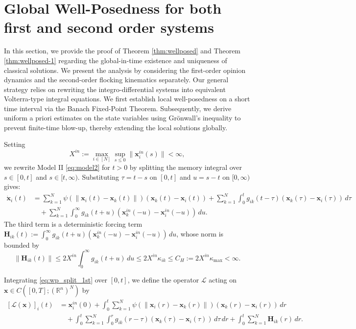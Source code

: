 \documentclass[11pt]{amsart}
\numberwithin{equation}{section}
\begin{document}
\section{Global Well-Posedness for both first and second order systems}\label{sec:proof_wp}
In this section, we provide the proof of Theorem \ref{thm:wellposed} and Theorem \ref{thm:wellposed-1} regarding the global-in-time existence and uniqueness of classical solutions. We present the analysis by considering the first-order opinion dynamics and the second-order flocking kinematics separately. Our general strategy relies on rewriting the integro-differential systems into equivalent Volterra-type integral equations. We first establish local well-posedness on a short time interval via the Banach Fixed-Point Theorem. Subsequently, we derive uniform a priori estimates on the state variables using Gr\"onwall's inequality to prevent finite-time blow-up, thereby extending the local solutions globally.

 Setting
$$
X^{in} := \max_{i\in[N]} \sup_{s \le 0} \|\boldsymbol{x}^{in}_i(s)\| < \infty,
$$
we rewrite Model II \eqref{eq:model2} for $t > 0$ by splitting the memory integral over $s\in[0,t]$ and $s\in[t,\infty)$. Substituting $\tau = t-s$ on $[0,t]$ and $u = s-t$ on $[0,\infty)$ gives:
\begin{equation}\label{eq:wp_split_1st}
\begin{aligned}
\dot{\boldsymbol{x}}_i(t) &= \sum_{k=1}^N \psi(\|\boldsymbol{x}_i(t)-\boldsymbol{x}_k(t)\|) (\boldsymbol{x}_k(t)-\boldsymbol{x}_i(t)) + \sum_{k=1}^N \int_0^t g_{ik}(t-\tau)(\boldsymbol{x}_k(\tau)-\boldsymbol{x}_i(\tau)) \, d\tau \\
&\quad + \sum_{k=1}^N \int_0^\infty g_{ik}(t+u)(\boldsymbol{x}^{in}_k(-u)-\boldsymbol{x}^{in}_i(-u)) \, du.
\end{aligned}
\end{equation}
The third term is a deterministic forcing term $\boldsymbol{H}_{ik}(t) := \int_0^\infty g_{ik}(t+u)(\boldsymbol{x}^{in}_k(-u)-\boldsymbol{x}^{in}_i(-u)) \, du$, whose norm is bounded by
\begin{equation}\label{eq:H_bound_1st}
\|\boldsymbol{H}_{ik}(t)\| \le 2X^{in} \int_0^\infty g_{ik}(t+u)\,du \le 2X^{in} \kappa_{ik} \le C_H := 2X^{in} \kappa_{\max} < \infty.
\end{equation}

Integrating \eqref{eq:wp_split_1st} over $[0,t]$, we define the operator $\mathcal{L}$ acting on $\boldsymbol{x}\in C([0,T];(\mathbb{R}^n)^N)$ by
\begin{equation}\label{eq:operatorL_1st}
\begin{aligned}
[\mathcal{L}(\boldsymbol{x})]_i(t) &= \boldsymbol{x}^{in}_i(0) + \int_0^t \sum_{k=1}^N \psi(\|\boldsymbol{x}_i(r)-\boldsymbol{x}_k(r)\|)(\boldsymbol{x}_k(r)-\boldsymbol{x}_i(r)) \, dr \\
&\quad + \int_0^t \sum_{k=1}^N \int_0^r g_{ik}(r-\tau)(\boldsymbol{x}_k(\tau)-\boldsymbol{x}_i(\tau)) \, d\tau\, dr + \int_0^t \sum_{k=1}^N \boldsymbol{H}_{ik}(r) \, dr.
\end{aligned}
\end{equation}
\end{document}
